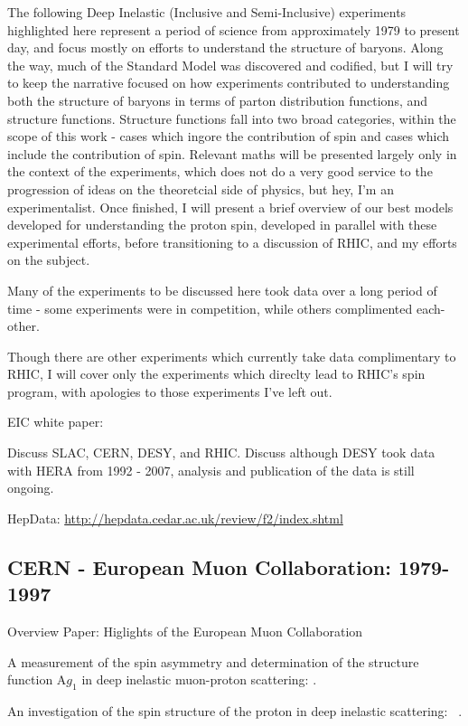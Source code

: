 The following Deep Inelastic (Inclusive and Semi-Inclusive) experiments
highlighted here represent a period of science from approximately 1979 to
present day, and focus mostly on efforts to understand the structure of baryons.
Along the way, much of the Standard Model was discovered and codified, but I
will try to keep the narrative focused on how experiments contributed to
understanding both the structure of baryons in terms of parton distribution
functions, and structure functions. Structure functions fall into two broad
categories, within the scope of this work - cases which ingore the contribution
of spin and cases which include the contribution of spin. Relevant maths will be
presented largely only in the context of the experiments, which does not do a
very good service to the progression of ideas on the theoretcial side of
physics, but hey, I'm an experimentalist. Once finished, I will present a brief
overview of our best models developed for understanding the proton spin,
developed in parallel with these experimental efforts, before transitioning to a
discussion of RHIC, and my efforts on the subject.

Many of the experiments to be discussed here took data over a long period of
time - some experiments were in competition, while others complimented
each-other.

Though there are other experiments which currently take data complimentary to
RHIC, I will cover only the experiments which direclty lead to RHIC's spin
program, with apologies to those experiments I've left out. 

EIC white paper: ~\cite{Accardi2012}

Discuss SLAC, CERN, DESY, and RHIC. Discuss although DESY took data with HERA
from 1992 - 2007, analysis and publication of the data is still ongoing.

HepData: \url{http://hepdata.cedar.ac.uk/review/f2/index.shtml}


\subsection{CERN - European Muon Collaboration: 1979-1997}
Overview Paper: Higlights of the European Muon Collaboration
~\cite{Kullander1990a}

A measurement of the spin asymmetry and determination of the structure function
A$g_1$ in deep inelastic muon-proton scattering: \cite{Ashman1988}.

An investigation of the spin structure of the proton in deep inelastic
scattering: ~\cite{Ashman1989}.

